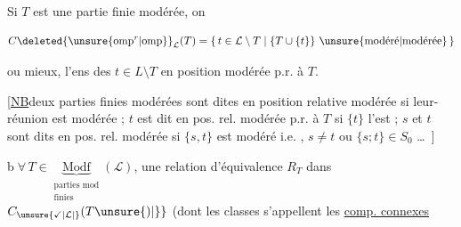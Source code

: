 


Si $T$ est une partie finie
modérée\unsure{,|;}, on  

\[
 C\deleted{\unsure{\mathrm{omp}^{r}|\mathrm{omp}}}_{\mathcal L}(T)=
 \{\,t\in\mathcal L\setminus T\mid \{T\cup\{t\}\}\ \text{\unsure{modéré|modérée}}\,\}
\]


ou mieux, l'ens des $t\in L\setminus T$ en
position modérée p.r. à $T$.

[\uline{NB}\quad deux parties finies modérées
sont dites en position relative
modérée si leur-réunion est
modérée ; $t$ est dit en pos. rel.
modérée p.r. à $T$ si $\{t\}$ l'est ;
$s$ et $t$ sont dits en pos. rel. modérée
si $\{s,t\}$ est modéré i.e. ,
$s\ne t$ ou $\{s;t\}\in S_0$ \ldots\ ]


\textcircled{\scriptsize b}\quad $\forall\,T\in\underbrace{\mathrm{Modf}}_{\substack{\text{parties mod}\\\text{finies}}}(\mathcal L)$, une relation
d'équivalence $R_T$ dans $C_{\unsure{\checkmark|\mathcal L|}}(T\unsure{)|\}}$ (dont
les classes s'appellent les \uline{comp. connexes} 

